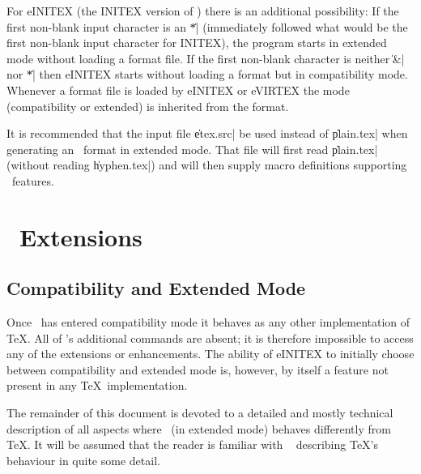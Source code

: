 \documentclass{article}
\begin{document}
For eINITEX (the INITEX version of \eTeX) there is an additional
possibility:  If the first non-blank input character is an \|*|
(immediately followed what would be the first non-blank input character
for INITEX), the program starts in extended mode without loading a
format file.  If the first non-blank character is neither \|&| nor \|*|
then eINITEX starts without loading a format but in compatibility mode.
Whenever a format file is loaded by eINITEX or eVIRTEX the mode
(compatibility or extended) is inherited from the format.

It is recommended that the input file \|etex.src| be used instead of
\|plain.tex| when generating an \eTeX\ format in extended mode.  That
file will first read \|plain.tex| (without reading \|hyphen.tex|) and
will then supply macro definitions supporting \eTeX\ features.

\section{\eTeX\ Extensions}

\subsection{Compatibility and Extended Mode}

Once \eTeX\ has entered compatibility mode it behaves as any other
implementation of \TeX.  All of \eTeX's additional commands are absent;
it is therefore impossible to access any of the extensions or
enhancements.  The ability of eINITEX to initially choose between
compatibility and extended mode is, however, by itself a feature not
present in any \TeX\ implementation.

The remainder of this document is devoted to a detailed and mostly
technical description of all aspects where \eTeX\ (in extended mode)
behaves differently from \TeX. It will be assumed that the reader is
familiar with \TeXbook\ \cite{texbook} describing \TeX's behaviour in
quite some detail.
\end{document}
